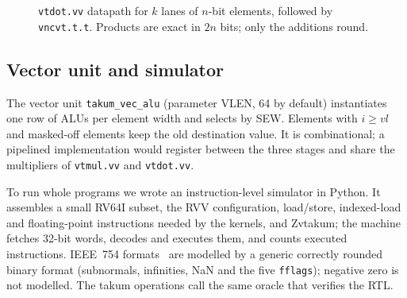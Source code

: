 \documentclass[conference]{IEEEtran}
\newcommand{\code}[1]{\texttt{#1}}
\begin{document}
\begin{figure}[t]
\centering
{}
\caption{\code{vtdot.vv} datapath for $k$ lanes of $n$-bit elements, followed by \code{vncvt.t.t}.
Products are exact in $2n$ bits; only the additions round.}
\label{fig:dot}
\end{figure}

\subsection{Vector unit and simulator}

The vector unit \code{takum\_vec\_alu} (parameter VLEN, 64 by default) instantiates one row of ALUs per
element width and selects by SEW. Elements with $i\ge \mathit{vl}$ and masked-off elements keep the old
destination value. It is combinational; a pipelined implementation would register between the three
stages and share the multipliers of \code{vtmul.vv} and \code{vtdot.vv}.

To run whole programs we wrote an instruction-level simulator in Python. It assembles a small RV64I
subset, the RVV configuration, load/store, indexed-load and floating-point instructions needed by the
kernels, and Zvtakum; the machine fetches 32-bit words, decodes and executes them, and counts executed
instructions. IEEE~754 formats~\cite{ieee754} are modelled by a generic correctly rounded binary format (subnormals,
infinities, NaN and the five \code{fflags}); negative zero is not modelled. The takum operations call the
same oracle that verifies the RTL.
\end{document}
